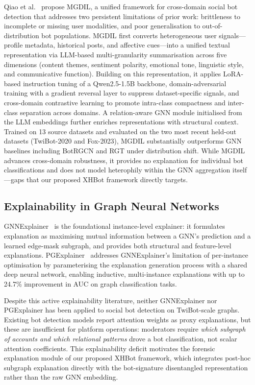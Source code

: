 Qiao et al.~\cite{qiao2026mgdil} propose MGDIL, a unified framework for cross-domain social
bot detection that addresses two persistent limitations of prior work: brittleness
to incomplete or missing user modalities, and poor generalisation to out-of-distribution
bot populations.
MGDIL first converts heterogeneous user signals---profile metadata, historical posts,
and affective cues---into a unified textual representation via LLM-based
multi-granularity summarisation across five dimensions (content themes, sentiment
polarity, emotional tone, linguistic style, and communicative function).
Building on this representation, it applies LoRA-based instruction tuning of a
Qwen2.5-1.5B backbone, domain-adversarial training with a gradient reversal layer
to suppress dataset-specific signals, and cross-domain contrastive learning to
promote intra-class compactness and inter-class separation across domains.
A relation-aware GNN module initialised from the LLM embeddings further enriches
representations with structural context.
Trained on 13 source datasets and evaluated on the two most recent held-out datasets
(TwiBot-2020 and Fox-2023), MGDIL substantially outperforms GNN baselines including
BotRGCN and RGT under distribution shift.
While MGDIL advances cross-domain robustness, it provides no explanation for
individual bot classifications and does not model heterophily within the GNN
aggregation itself---gaps that our proposed XHBot framework directly targets.

\subsection{Explainability in Graph Neural Networks}

GNNExplainer~\cite{ying2019gnnexplainer} is the foundational instance-level
explainer: it formulates explanation as maximising mutual information between a GNN's
prediction and a learned edge-mask subgraph, and provides both structural and
feature-level explanations.
PGExplainer~\cite{luo2020pgexplainer} addresses GNNExplainer's limitation of
per-instance optimisation by parameterising the explanation generation process with
a shared deep neural network, enabling inductive, multi-instance explanations with
up to 24.7\% improvement in AUC on graph classification tasks.

Despite this active explainability literature, neither GNNExplainer nor PGExplainer
has been applied to social bot detection on TwiBot-scale graphs.
Existing bot detection models report attention weights as proxy explanations, but
these are insufficient for platform operations: moderators require \emph{which
subgraph of accounts and which relational patterns} drove a bot classification,
not scalar attention coefficients.
This explainability deficit motivates the forensic explanation module of our proposed
XHBot framework, which integrates post-hoc subgraph explanation directly with the
bot-signature disentangled representation rather than the raw GNN embedding.

